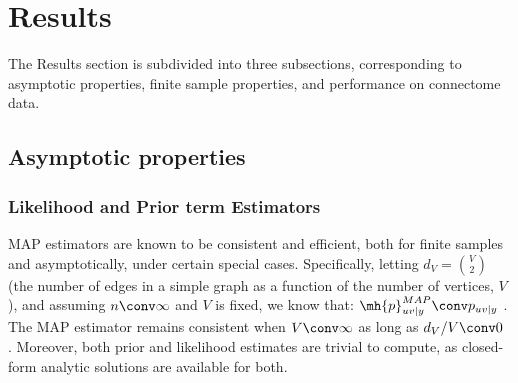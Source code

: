 \documentclass[10pt,journal,cspaper,compsoc]{IEEEtran}
\begin{document}
% 



\section{Results} %
\label{sec:results}

The Results section is subdivided into three subsections, corresponding to asymptotic properties, finite sample properties, and performance on connectome data. 

\subsection{Asymptotic properties} %
\label{sub:estimator_properties}

\subsubsection{Likelihood and Prior term Estimators} %
\label{ssub:subsubsection_name4}


MAP estimators are known to be consistent and efficient, both for finite samples and asymptotically, under certain special cases.  Specifically, letting $d_V=\binom{V}{2}$ (the number of edges in a simple graph as a function of the number of vertices, $V$), and assuming $n \conv \infty$ and $V$ is fixed,  we know that: $\mh{p}_{uv|y}^{MAP} \conv p_{uv|y}$ \cite{}. The MAP estimator remains consistent when $V \conv \infty$ as long as $d_V/V \conv 0$ \cite{}.  Moreover, both prior and likelihood estimates are trivial to compute, as closed-form analytic solutions are available for both.  %
\end{document}
